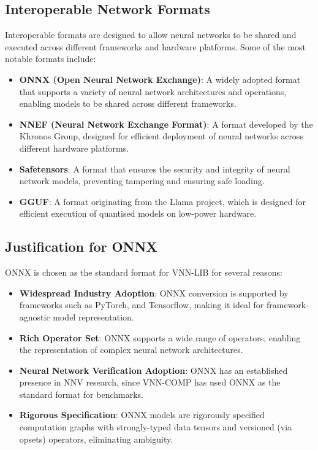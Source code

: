 \subsection{Interoperable Network Formats}
Interoperable formats are designed to allow neural networks to be shared and executed across different frameworks and hardware platforms. Some of the most notable formats include:
\begin{itemize}
	\item \textbf{ONNX (Open Neural Network Exchange)}: A widely adopted format that supports a variety of neural network architectures and operations, enabling models to be shared across different frameworks.
	\item \textbf{NNEF (Neural Network Exchange Format)}: A format developed by the Khronos Group, designed for efficient deployment of neural networks across different hardware platforms.
	\item \textbf{Safetensors}: A format that ensures the security and integrity of neural network models, preventing tampering and ensuring safe loading.
	\item \textbf{GGUF}: A format originating from the Llama project, which is designed for efficient execution of quantised models on low-power hardware. 
\end{itemize}

\subsection{Justification for ONNX}
ONNX is chosen as the standard format for VNN-LIB for several reasons:
\begin{itemize}
	\item \textbf{Widespread Industry Adoption}: ONNX conversion is supported by frameworks such as PyTorch, and Tensorflow, making it ideal for framework-agnostic model representation.
	\item \textbf{Rich Operator Set}: ONNX supports a wide range of operators, enabling the representation of complex neural network architectures.
	\item \textbf{Neural Network Verification Adoption}: ONNX has an established presence in NNV research, since VNN-COMP has used ONNX as the standard format for benchmarks.
	\item \textbf{Rigorous Specification}: ONNX models are rigorously specified computation graphs with strongly-typed data tensors and versioned (via opsets) operators, eliminating ambiguity.
\end{itemize}


